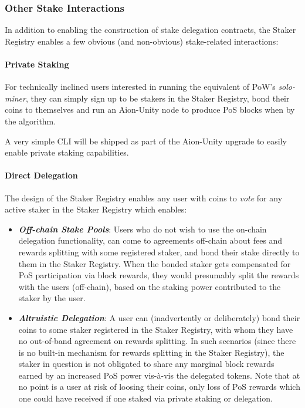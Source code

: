 \subsubsection{Other Stake Interactions} \label{staker_reg_interactions}

In addition to enabling the construction of stake delegation contracts, the Staker Registry enables a few obvious (and non-obvious) stake-related interactions:

\paragraph{Private Staking}
For technically inclined users interested in running the equivalent of PoW's \textit{solo-miner}, they can simply sign up to be stakers in the Staker Registry, bond their coins to themselves and run an Aion-Unity node to produce PoS blocks when  by the algorithm. 

A very simple CLI will be shipped as part of the Aion-Unity upgrade to easily enable private staking capabilities. 

\paragraph{Direct Delegation}
The design of the Staker Registry enables any user with coins to \textit{vote} for any active staker in the Staker Registry which enables:
\begin{itemize}
    \item \textbf{\textit{Off-chain Stake Pools}}: Users who do not wish to use the on-chain delegation functionality, can come to agreements off-chain about fees and rewards splitting with some registered staker, and bond their stake directly to them in the Staker Registry. When the bonded staker gets compensated for PoS participation via block rewards, they would presumably split the rewards with the users (off-chain), based on the staking power contributed to the staker by the user. 
    
    \item \textbf{\textit{Altruistic Delegation}}: A user can (inadvertently or deliberately) bond their coins to some staker registered in the Staker Registry, with whom they have no out-of-band agreement on rewards splitting. In such scenarios (since there is no built-in mechanism for rewards splitting in the Staker Registry), the staker in question is not obligated to share any marginal block rewards earned by an increased PoS power vis-à-vis the  delegated tokens. Note that at no point is a user at risk of loosing their coins, only loss of PoS rewards which one could have received if one staked via private staking or delegation. 
\end{itemize}

